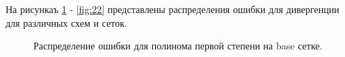 На рисункаъ \ref{fig:18} - \ref{fig:22} представлены распределения ошибки для дивергенции для различных схем и сеток.


\begin{figure}[H]
    \centering
    \caption{Распределение ошибки для полинома первой степени на base сетке.}
    \label{fig:18}
\end{figure}

